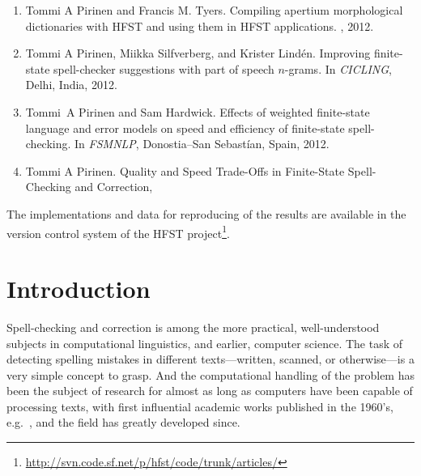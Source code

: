 \documentclass[officiallayout]{unihelcompling}
\newcommand\misspelt{\bgroup\markoverwith
{\textcolor{red}{\lower3.5pt\hbox{\sixly \char58}}}\ULon}
\begin{document}
\begin{enumerate}
    \item[\citetalias{pirinen2012compiling}]
        Tommi A Pirinen and Francis M. Tyers.
        \newblock Compiling apertium morphological dictionaries with HFST and
        using them in HFST applications.
        , 2012.
    \item[\citetalias{pirinen2012improving}]
        Tommi A Pirinen, Miikka Silfverberg, and Krister Lindén.
        \newblock Improving finite-state spell-checker suggestions with part of
        speech \(n\)-grams.
        \newblock In {\em CICLING}, Delhi, India, 2012.
    \item[\citetalias{pirinen2012effects}]
        Tommi~A Pirinen and Sam Hardwick.
        \newblock Effects of weighted finite-state language and error models on
        speed and efficiency of finite-state spell-checking.
        \newblock In {\em FSMNLP}, Donostia--San Sebastían, Spain, 2012.
    \item[\citetalias{pirinen2013quality}]
        Tommi A Pirinen.
        \newblock Quality and Speed Trade-Offs in
        Finite-State Spell-Checking and Correction, \misspelt{forthcoming}
\end{enumerate}

The implementations and data for reproducing of the results are available
in the version control system of the HFST project\footnote{\url{http://svn.code.sf.net/p/hfst/code/trunk/articles/}}.

\tableofcontents

\listoftables

\listoffigures

\listoftodos

\chapter{Introduction}
\label{chap:introduction}

Spell-checking and correction is among the more practical, well-understood
subjects in computational linguistics, and earlier, computer science.  The task
of detecting spelling mistakes in different texts---written, scanned, or
otherwise---is a very simple concept to grasp. And the computational handling
of the problem has been the subject of research for almost as long as computers
have been capable of processing texts, with first influential academic works
published in the 1960's, e.g.~\cite{damerau1964technique}, and the field has
greatly developed since.
\end{document}
